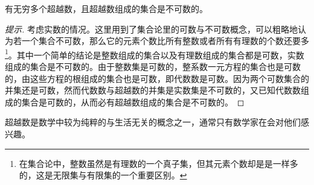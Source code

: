 \begin{theorem}
  有无穷多个超越数，且超越数组成的集合是不可数的。
\end{theorem}
\begin{proof}[提示]
  考虑实数的情况。这里用到了集合论里的可数与不可数概念，可以粗略地认为若一个集合不可数，那么它的元素个数比所有整数或者所有有理数的个数还要多\footnote{在集合论中，整数虽然是有理数的一个真子集，但其元素个数却是是一样多的，这是无限集与有限集的一个重要区别。}。其中一个简单的结论是整数组成的集合以及有理数组成的集合都是可数，实数组成的集合是不可数的。由于整数集是可数的，整系数一元方程的集合也是可数的，由这些方程的根组成的集合也是可数，即代数数是可数。因为两个可数集合的并集还是可数，然而代数数与超越数的并集是实数集是不可数的，又已知代数数组成的集合是可数的，从而必有超越数组成的集合是不可数的。
\end{proof}

超越数是数学中较为纯粹的与生活无关的概念之一，通常只有数学家在会对他们感兴趣。